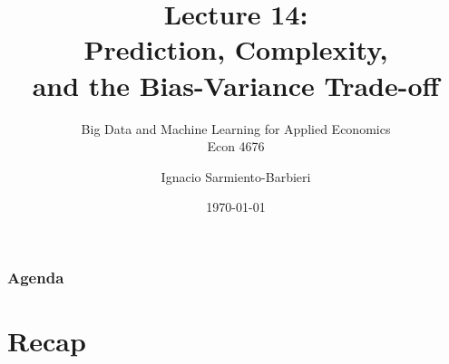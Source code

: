 \documentclass[
  shownotes,
  xcolor={svgnames},
  hyperref={colorlinks,citecolor=DarkBlue,linkcolor=DarkRed,urlcolor=DarkBlue}
  , aspectratio=169]{beamer}
\begin{document}
\title[Lecture 14]{Lecture 14: \\ Prediction, Complexity, \\ and the Bias-Variance Trade-off}
\subtitle{Big Data and Machine Learning for Applied Economics \\ Econ 4676}
\date{\today}

\author[Sarmiento-Barbieri]{Ignacio Sarmiento-Barbieri}


\begin{frame}[noframenumbering]
\maketitle
\end{frame}





\begin{frame}
\frametitle{Agenda}

\tableofcontents


\end{frame}



\section{Recap}
\end{document}
